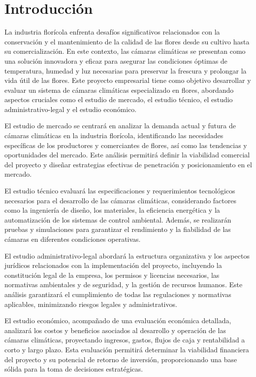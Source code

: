 \chapter{Introducción}

La industria florícola enfrenta desafíos significativos relacionados con la conservación y el mantenimiento de la calidad de las flores desde su cultivo hasta su comercialización. En este contexto, las cámaras climáticas se presentan como una solución innovadora y eficaz para asegurar las condiciones óptimas de temperatura, humedad y luz necesarias para preservar la frescura y prolongar la vida útil de las flores. Este proyecto empresarial tiene como objetivo desarrollar y evaluar un sistema de cámaras climáticas especializado en flores, abordando aspectos cruciales como el estudio de mercado, el estudio técnico, el estudio administrativo-legal y el estudio económico.

El estudio de mercado se centrará en analizar la demanda actual y futura de cámaras climáticas en la industria florícola, identificando las necesidades específicas de los productores y comerciantes de flores, así como las tendencias y oportunidades del mercado. Este análisis permitirá definir la viabilidad comercial del proyecto y diseñar estrategias efectivas de penetración y posicionamiento en el mercado.

El estudio técnico evaluará las especificaciones y requerimientos tecnológicos necesarios para el desarrollo de las cámaras climáticas, considerando factores como la ingeniería de diseño, los materiales, la eficiencia energética y la automatización de los sistemas de control ambiental. Además, se realizarán pruebas y simulaciones para garantizar el rendimiento y la fiabilidad de las cámaras en diferentes condiciones operativas.

El estudio administrativo-legal abordará la estructura organizativa y los aspectos jurídicos relacionados con la implementación del proyecto, incluyendo la constitución legal de la empresa, los permisos y licencias necesarios, las normativas ambientales y de seguridad, y la gestión de recursos humanos. Este análisis garantizará el cumplimiento de todas las regulaciones y normativas aplicables, minimizando riesgos legales y administrativos.

El estudio económico, acompañado de una evaluación económica detallada, analizará los costos y beneficios asociados al desarrollo y operación de las cámaras climáticas, proyectando ingresos, gastos, flujos de caja y rentabilidad a corto y largo plazo. Esta evaluación permitirá determinar la viabilidad financiera del proyecto y su potencial de retorno de inversión, proporcionando una base sólida para la toma de decisiones estratégicas.

